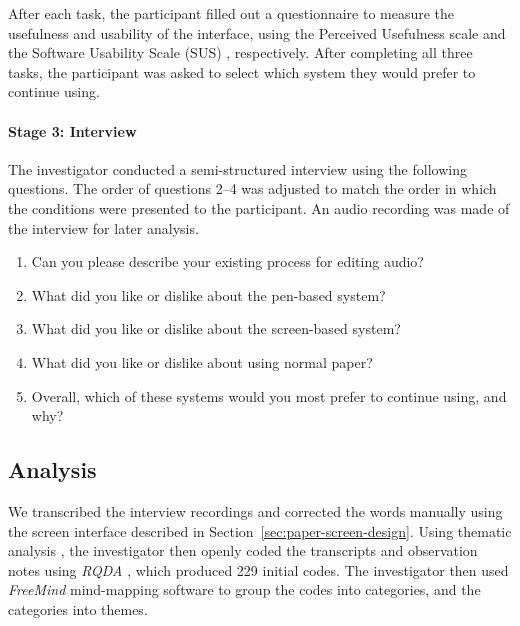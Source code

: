 After each task, the participant filled out a questionnaire to measure the usefulness and usability of the interface,
using the Perceived Usefulness scale \citep{Davis1989} and the Software Usability Scale (SUS) \citep{Brooke1996},
respectively.  After completing all three tasks, the participant was asked to select which system they would prefer to
continue using.












\paragraph{Stage 3: Interview}

The investigator conducted a semi-structured interview using the following questions.  The order of questions 2--4 was
adjusted to match the order in which the conditions were presented to the participant.  An audio recording was made of
the interview for later analysis.



{\singlespacing
  \begin{enumerate}
    \item Can you please describe your existing process for editing audio?
    \item What did you like or dislike about the pen-based system?
    \item What did you like or dislike about the screen-based system?
    \item What did you like or dislike about using normal paper?
    \item Overall, which of these systems would you most prefer to continue using, and why?
  \end{enumerate}
}




\subsection{Analysis}

We transcribed the interview recordings and corrected the words manually using the screen interface described in
Section~\ref{sec:paper-screen-design}.  Using
thematic analysis \citep{Braun2006}, the investigator then openly coded the transcripts and observation notes using
\textit{RQDA} \citep{RQDA}, which produced 229 initial codes. The investigator then used \textit{FreeMind} mind-mapping
software to group the codes into categories, and the categories into themes.

